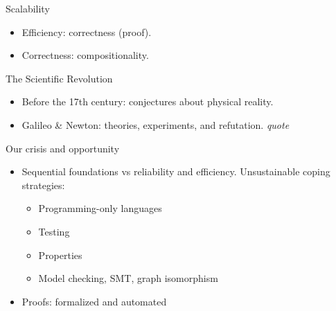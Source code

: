 \documentclass[aspectratio=169]{beamer}
\begin{document}
\begin{center}
\maketitle
{}
\end{center}

\begin{frame}{Scalability}
\begin{itemize}\itemsep3ex
\item Efficiency: correctness (proof).
\item Correctness: compositionality.
\end{itemize}
\end{frame}

\begin{frame}{The Scientific Revolution}
\begin{itemize}\itemsep3ex
\item Before the 17th century: conjectures about physical reality.
\item Galileo \& Newton: theories, experiments, and refutation. \emph{quote}
\end{itemize}
\end{frame}

\begin{frame}{Our crisis and opportunity}
\begin{itemize}\itemsep3ex
\item Sequential foundations vs reliability and efficiency.
Unsustainable coping strategies:
 \begin{itemize}\itemsep3ex
 \item Programming-only languages
 \item Testing
 \item Properties
 \item Model checking, SMT, graph isomorphism
 \end{itemize}
\item Proofs: formalized and automated
\end{itemize}
\end{frame}
\end{document}

